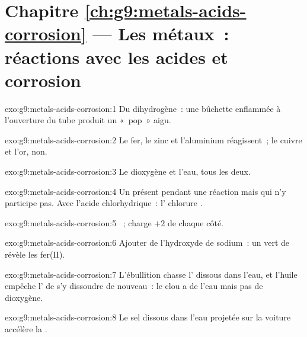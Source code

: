 \section*{Chapitre \ref{ch:g9:metals-acids-corrosion} --- Les métaux~: réactions avec les acides et corrosion}

\begin{solution}{exo:g9:metals-acids-corrosion:1}
Du dihydrogène~: une bûchette enflammée à l'ouverture du tube produit un
«~pop~» aigu.
\end{solution}

\begin{solution}{exo:g9:metals-acids-corrosion:2}
Le fer, le zinc et l'aluminium réagissent~; le cuivre et l'or, non.
\end{solution}

\begin{solution}{exo:g9:metals-acids-corrosion:3}
Le dioxygène et l'eau, tous les deux.
\end{solution}

\begin{solution}{exo:g9:metals-acids-corrosion:4}
Un  présent pendant une réaction mais qui n'y participe pas. Avec
l'acide chlorhydrique~: l' chlorure .
\end{solution}

\begin{solution}{exo:g9:metals-acids-corrosion:5}
~; charge $+2$ de chaque côté.
\end{solution}

\begin{solution}{exo:g9:metals-acids-corrosion:6}
Ajouter de l'hydroxyde de sodium~: un  vert de 
révèle les  fer(II).
\end{solution}

\begin{solution}{exo:g9:metals-acids-corrosion:7}
L'ébullition chasse l' dissous dans l'eau, et l'huile empêche l'
de s'y dissoudre de nouveau~: le clou a de l'eau mais pas de dioxygène.
\end{solution}

\begin{solution}{exo:g9:metals-acids-corrosion:8}
Le sel dissous dans l'eau projetée sur la voiture accélère la .
\end{solution}

